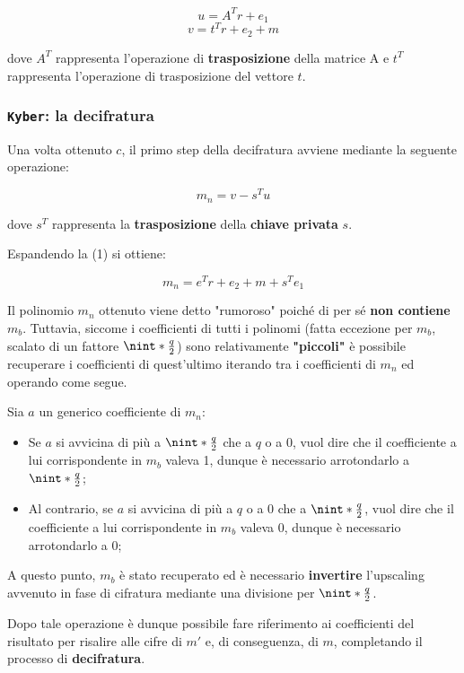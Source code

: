 \documentclass[a4paper, 12pt, oneside]{article}
\DeclarePairedDelimiter{\nint}\lfloor\rceil %
\theoremstyle{definition}
\begin{document}
\[ u = A^Tr + e_1 \] \[v = t^Tr + e_2 + m \]

dove $A^T$ rappresenta l'operazione di \textbf{trasposizione} della matrice A e $t^T$ rappresenta l'operazione di trasposizione del vettore $t$.

\subsubsection{\texttt{Kyber}: la decifratura}
Una volta ottenuto $c$, il primo step della decifratura avviene mediante la seguente operazione:

\begin{equation}
    m_n = v - s^Tu
\end{equation}

dove $s^T$ rappresenta la \textbf{trasposizione} della \textbf{chiave privata} $s$. 

Espandendo la (1) si ottiene:

\begin{equation}
    m_n = e^Tr + e_2 + m + s^Te_1
\end{equation}

Il polinomio $m_n$ ottenuto viene detto "rumoroso" poiché di per sé \textbf{non contiene $m_b$}.
Tuttavia, siccome i coefficienti di tutti i polinomi (fatta eccezione per $m_b$, scalato di un fattore $\nint*{\frac{q}{2}}$) sono relativamente \textbf{"piccoli"} è possibile recuperare i coefficienti di quest'ultimo iterando tra i coefficienti di $m_n$ ed operando come segue. 

Sia $a$ un generico coefficiente di $m_n$:

\begin{itemize}
    \item Se $a$ si avvicina di più a $\nint*{\frac{q}{2}}$ che a $q$ o a 0, vuol dire che il coefficiente a lui corrispondente in $m_b$ valeva 1, dunque è necessario arrotondarlo a $\nint*{\frac{q}{2}}$;
    \item Al contrario, se $a$ si avvicina di più a $q$ o a 0 che a $\nint*{\frac{q}{2}}$, vuol dire che il coefficiente a lui corrispondente in $m_b$ valeva 0, dunque è necessario arrotondarlo a $0$;
\end{itemize}

A questo punto, $m_b$ è stato recuperato ed è necessario \textbf{invertire} l'upscaling avvenuto in fase di cifratura mediante una divisione per $\nint*{\frac{q}{2}}$.

Dopo tale operazione è dunque possibile fare riferimento ai coefficienti del risultato per risalire alle cifre di $m'$ e, di conseguenza, di $m$, completando il processo di \textbf{decifratura}.
\end{document}
